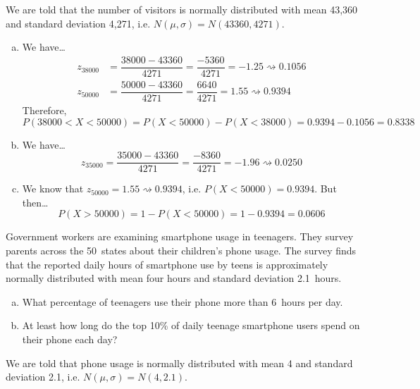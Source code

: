 \documentclass[11pt,letterpaper]{article}
\newcommand{\squiggle}{\rightsquigarrow}
\begin{document}
\sol We are told that the number of visitors is normally distributed with mean 43,360 and standard deviation 4,271, i.e. $N(\mu, \sigma)= N(43360, 4271)$. 

\begin{enumerate}[(a)]
\item We have\dots
	\[
	\begin{aligned}
	z_{38000}&= \dfrac{38000 - 43360}{4271}= \dfrac{-5360}{4271}= -1.25 \squiggle 0.1056 \\[0.3cm]
	z_{50000}&= \dfrac{50000 - 43360}{4271}= \dfrac{6640}{4271}= 1.55 \squiggle 0.9394
	\end{aligned}
	\]
Therefore, 
	\[
	P(38000 < X < 50000)= P(X < 50000) - P(X < 38000)= 0.9394 - 0.1056= 0.8338
	\] \pspace

\item We have\dots
	\[
	z_{35000}= \dfrac{35000 - 43360}{4271}= \dfrac{-8360}{4271}= -1.96 \squiggle 0.0250 
	\] \pspace

\item We know that $z_{50000}= 1.55 \squiggle 0.9394$, i.e. $P(X < 50000)= 0.9394$. But then\dots
	\[
	P(X > 50000)= 1 - P(X < 50000)= 1 - 0.9394= 0.0606
	\]
\end{enumerate}



\newpage



 Government workers are examining smartphone usage in teenagers. They survey parents across the 50~states about their children's phone usage. The survey finds that the reported daily hours of smartphone use by teens is approximately normally distributed with mean four hours and standard deviation 2.1~hours. 
	\begin{enumerate}[(a)]
	\item What percentage of teenagers use their phone more than 6~hours per day.
	\item At least how long do the top 10\% of daily teenage smartphone users spend on their phone each day?
	\end{enumerate} \pspace

\sol We are told that phone usage is normally distributed with mean 4 and standard deviation 2.1, i.e. $N(\mu, \sigma)= N(4, 2.1)$. 
\end{document}
